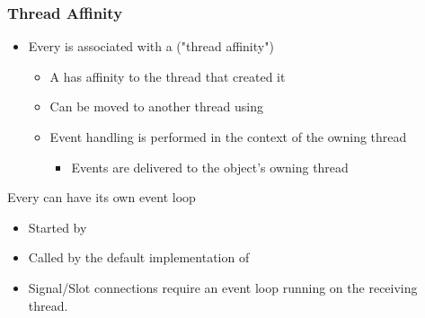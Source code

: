 \begin{slide}
\frametitle{Thread Affinity}

\begin{itemize}
\item Every  is associated with a  ("thread affinity")
  \begin{itemize}
  \item A  has affinity to the thread that created it
  \item Can be moved to another thread using 
  \item Event handling is performed in the context of the owning thread
    \begin{itemize}
    \item Events are delivered to the object's owning thread
    \end{itemize}
  \end{itemize}
\end{itemize}
\item Every  can have its own event loop
  \begin{itemize}
  \item Started by 
  \item Called by the default implementation of 
  \item Signal/Slot connections require an event loop running on the receiving thread.
  \end{itemize}
\end{slide}


